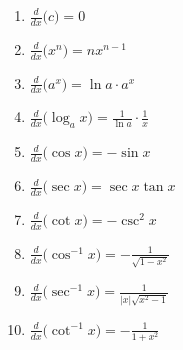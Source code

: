 {\begin{minipage}{.5\specialboxlength}
\begin{enumerate}
	\item		$\frac{d}{dx}\big(c\big) = 0$\addtocounter{enumi}{1}
	\item		$\frac{d}{dx}\big(x^n\big) = nx^{n-1}$\addtocounter{enumi}{1}
	\item		$\frac{d}{dx}\big(a^x\big) = \ln a\cdot a^x$\addtocounter{enumi}{1}
	\item		$\frac{d}{dx}\big(\log_a x\big) = \frac{1}{\ln a}\cdot\frac{1}{x}$\addtocounter{enumi}{1}
	\item		$\frac{d}{dx}\big(\cos x\big) = -\sin x$\addtocounter{enumi}{1}
	\item		$\frac{d}{dx}\big(\sec x\big) = \sec x\tan x$\addtocounter{enumi}{1}
	\item		$\frac{d}{dx}\big(\cot x\big) = -\csc^2x$\addtocounter{enumi}{1}
	\item		$\frac{d}{dx}\big(\cos^{-1}x\big) = -\frac{1}{\sqrt{1-x^2}}$\addtocounter{enumi}{1}
	\item		$\frac{d}{dx}\big(\sec^{-1}x\big) = \frac{1}{|x|\sqrt{x^2-1}}$\addtocounter{enumi}{1}
	\item		$\frac{d}{dx}\big(\cot^{-1}x\big) = -\frac{1}{1+x^2}$
	\end{enumerate}
\normalsize
\end{minipage}
}

